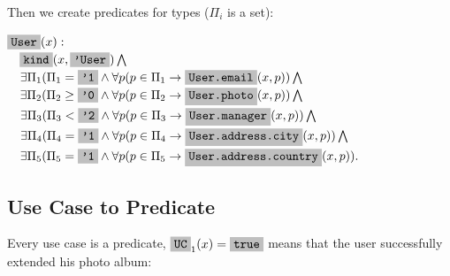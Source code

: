 \documentclass[12pt,oneside,letterpaper]{article}
\begin{document}
        Then we create predicates for types ($\Pi_i$ is a set):

        \begin{maths}
        $\type{User}(x) :$ \\
        $\quad \type{kind}(x, \type{'User}) \bigwedge$ \\
        $\quad \exists \Pi_1 (\Pi_1 = \type{'1} \wedge \forall p(p \in \Pi_1 \to \type{User.email}(x, p)) \bigwedge$ \\
        $\quad \exists \Pi_2 (\Pi_2 \geq \type{'0} \wedge \forall p(p \in \Pi_2 \to \type{User.photo}(x, p)) \bigwedge$ \\
        $\quad \exists \Pi_3 (\Pi_3 < \type{'2} \wedge \forall p(p \in \Pi_3 \to \type{User.manager}(x, p)) \bigwedge $ \\
        $\quad \exists \Pi_4 (\Pi_4 = \type{'1} \wedge \forall p(p \in \Pi_4 \to \type{User.address.city}(x, p)) \bigwedge $ \\
        $\quad \exists \Pi_5 (\Pi_5 = \type{'1} \wedge \forall p(p \in \Pi_5 \to \type{User.address.country}(x, p)). $ \\
        \end{maths}

    \subsection{Use Case to Predicate}

        Every use case is a predicate, $\type{UC}_1(x) = \type{true}$ means that the user
        successfully extended his photo album:
\end{document}
